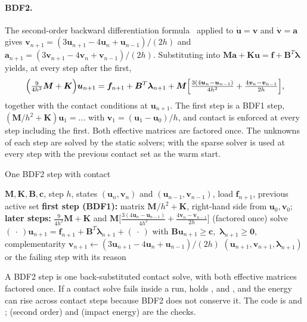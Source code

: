 \paragraph{BDF2.}
The second-order backward differentiation formula~\cite{hairer1996ode2} applied to $\dot{\bm u}=\bm v$ and $\dot{\bm v}=\bm a$ gives $\bm v_{n+1}=(3\bm u_{n+1}-4\bm u_n+\bm u_{n-1})/(2h)$ and $\bm a_{n+1}=(3\bm v_{n+1}-4\bm v_n+\bm v_{n-1})/(2h)$. Substituting into $\bm M\bm a+\bm K\bm u=\bm f+\bm B^T\bm\lambda$ yields, at every step after the first,
\begin{equation}\label{eq:ct-bdf2}
\Bigl(\tfrac{9}{4h^2}\bm M+\bm K\Bigr)\bm u_{n+1}=\bm f_{n+1}+\bm B^T\bm\lambda_{n+1}+\bm M\Bigl[\tfrac{3(4\bm u_n-\bm u_{n-1})}{4h^2}+\tfrac{4\bm v_n-\bm v_{n-1}}{2h}\Bigr],
\end{equation}
together with the contact conditions at $\bm u_{n+1}$. The first step is a BDF1 step, $(\bm M/h^2+\bm K)\bm u_1=\dots$ with $\bm v_1=(\bm u_1-\bm u_0)/h$, and contact is enforced at every step including the first. Both effective matrices are factored once. The unknowns of each step are solved by the static solvers; with  the sparse solver is used at every step with the previous contact set as the warm start.

\begin{algbox}{One BDF2 step with contact}
\begin{pseudo}
\Require $\bm M,\bm K,\bm B,\bm c$, step $h$, states $(\bm u_n,\bm v_n)$ and $(\bm u_{n-1},\bm v_{n-1})$, load $\bm f_{n+1}$, previous active set
\State \textbf{first step (BDF1):} matrix $\bm M/h^2+\bm K$, right-hand side from $\bm u_0,\bm v_0$; \textbf{later steps:} $\tfrac{9}{4h^2}\bm M+\bm K$ and $\bm M\big[\tfrac{3(4\bm u_n-\bm u_{n-1})}{4h^2}+\tfrac{4\bm v_n-\bm v_{n-1}}{2h}\big]$ (factored once)
\State solve $(\ \cdot\ )\bm u_{n+1}=\bm f_{n+1}+\bm B^T\bm\lambda_{n+1}+(\ \cdot\ )$ with $\bm B\bm u_{n+1}\ge\bm c$,\ $\bm\lambda_{n+1}\ge\bm0$, complementarity 
\State $\bm v_{n+1}\gets(3\bm u_{n+1}-4\bm u_n+\bm u_{n-1})/(2h)$ 
\Ensure $(\bm u_{n+1},\bm v_{n+1},\bm\lambda_{n+1})$ or the failing step with its reason
\end{pseudo}
\end{algbox}

A BDF2 step is one back-substituted contact solve, with both effective matrices factored once. If a contact solve fails inside a run,  holds ,  and , and the energy can rise across contact steps because BDF2 does not conserve it. The code is  and ;  (second order) and  (impact energy) are the checks.

